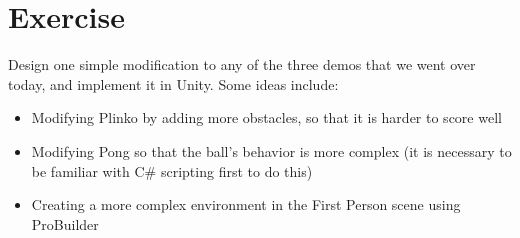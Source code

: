 \documentclass[11pt]{article}
\begin{document}
\section{Exercise}

Design one simple modification to any of the three demos that we went over today, and implement it in Unity.  Some ideas include:

\begin{itemize}
    \item Modifying Plinko by adding more obstacles, so that it is harder to score well
    \item Modifying Pong so that the ball's behavior is more complex (it is necessary to be familiar with C\# scripting first to do this)
    \item Creating a more complex environment in the First Person scene using ProBuilder
\end{itemize}
\end{document}
